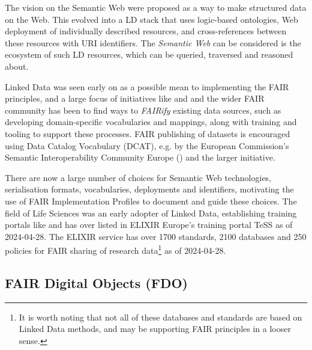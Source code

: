 The vision on the Semantic Web \cite{Berners-Lee 1999} were proposed as a way to make structured data on the Web. This evolved into a \acrfull{LD} stack that uses logic-based ontologies, Web deployment of individually described resources, and cross-references between these resources with \acrfull{URI} identifiers. The \emph{Semantic Web} can be considered is the ecosystem of such \acrlong{LD} resources, which can be queried, traversed and reasoned about. 

Linked Data was seen early on as a possible mean to implementing the FAIR principles, and a large focus of initiatives like  and  and the wider FAIR community has been to find ways to \emph{FAIRify} existing data sources, such as developing domain-specific vocabularies and mappings, along with training and tooling to support these processes. FAIR publishing of datasets is encouraged using Data Catalog Vocabulary (DCAT)\cite{Albertoni 2023}, e.g. by the European Commission's Semantic Interoperability Community Europe () and the larger  initiative.

There are now a large number of choices for Semantic Web technologies, serialisation formats, vocabularies, deployments and identifiers, motivating the use of FAIR Implementation Profiles \cite{Schultes 2020} to document and guide these choices. The field of Life Sciences was an early adopter of Linked Data, establishing training portals like  \cite{Rocca-Serra 2023} and has over  listed in ELIXIR Europe's training portal TeSS as of 2024-04-28. The ELIXIR service  \cite{Sansone 2019} has over 1700 standards, 2100 databases and 250 policies for FAIR sharing of research data\footnote{It is worth noting that not all of these databases and standards are based on Linked Data methods, and may be supporting FAIR principles in a looser sense.} as of 2024-04-28. 


\subsection{FAIR Digital Objects (FDO)}

